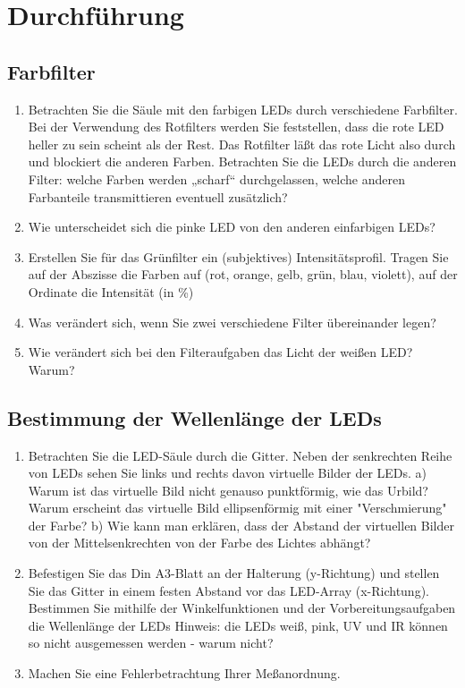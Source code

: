 \section{Durchführung}
\subsection{Farbfilter}
\begin{enumerate}
	\item Betrachten Sie die Säule mit den farbigen LEDs durch verschiedene Farbfilter. Bei der Verwendung des Rotfilters werden Sie feststellen, dass die rote LED heller zu sein scheint als der Rest. Das Rotfilter läßt das rote Licht also durch und blockiert die anderen Farben. Betrachten Sie die LEDs durch die anderen Filter: welche Farben werden „scharf“ durchgelassen, welche anderen Farbanteile transmittieren eventuell zusätzlich?
	\item Wie unterscheidet sich die pinke LED von den anderen einfarbigen LEDs?
	\item Erstellen Sie für das Grünfilter ein (subjektives) Intensitätsprofil. Tragen Sie auf der Abszisse die Farben auf (rot, orange, gelb, grün, blau, violett), auf der Ordinate die Intensität (in \%)
	\item Was verändert sich, wenn Sie zwei verschiedene Filter übereinander legen?
	\item Wie verändert sich bei den Filteraufgaben das Licht der weißen LED? Warum?
\end{enumerate}
\subsection{Bestimmung der Wellenlänge der LEDs}
\begin{enumerate}
	\item  Betrachten Sie die LED-Säule durch die Gitter. Neben der senkrechten Reihe von LEDs sehen Sie links und rechts davon virtuelle Bilder der LEDs. 
		\subitem a) Warum ist das virtuelle Bild nicht genauso punktförmig, wie das Urbild? Warum erscheint das virtuelle Bild ellipsenförmig mit einer "Verschmierung" der Farbe?
		\subitem b) Wie kann man erklären, dass der Abstand der virtuellen Bilder von der Mittelsenkrechten von der Farbe des Lichtes abhängt?
	\item Befestigen Sie das Din A3-Blatt an der Halterung (y-Richtung) und stellen Sie das Gitter in einem festen Abstand vor das LED-Array (x-Richtung). Bestimmen Sie mithilfe der Winkelfunktionen und der Vorbereitungsaufgaben die Wellenlänge der LEDs Hinweis: die LEDs weiß, pink, UV und IR können so nicht ausgemessen werden - warum nicht?
	\item Machen Sie eine Fehlerbetrachtung Ihrer Meßanordnung.
\end{enumerate}
